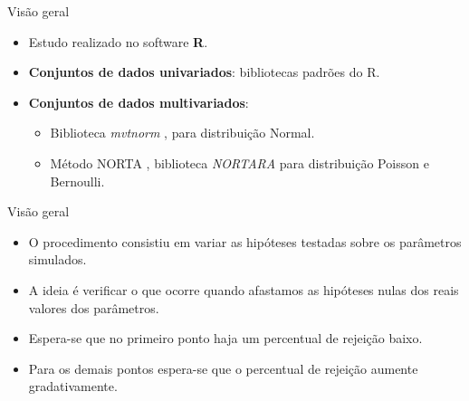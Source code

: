 \documentclass[
  ignorenonframetext,
  serif,
  professionalfont,
  usenames,
  dvipsnames,
  aspectratio = 169]{beamer}
\begin{document}
\begin{frame}{Visão geral}
\protect\hypertarget{visuxe3o-geral-2}{}
\begin{itemize}
    \itemsep 2ex
    
  \item Estudo realizado no software \textbf{R}.

  \item \textbf{Conjuntos de dados univariados}: bibliotecas padrões do R. 

  \item \textbf{Conjuntos de dados multivariados}:
    \begin{itemize}
      \item Biblioteca \emph{mvtnorm} \citep{mvtnorm1}, \citep{mvtnorm2} para distribuição Normal.

        \item Método NORTA \citep{cario1997modeling}, biblioteca \emph{NORTARA} \citep{nortara} para distribuição Poisson e Bernoulli.
    \end{itemize}
\end{itemize}
\end{frame}

\begin{frame}{Visão geral}
\protect\hypertarget{visuxe3o-geral-3}{}
\begin{itemize}
  \itemsep 2ex
    
  \item O procedimento consistiu em variar as hipóteses testadas sobre os parâmetros simulados. 

  \item A ideia é verificar o que ocorre quando afastamos as hipóteses nulas dos reais valores dos parâmetros. 

  \item Espera-se que no primeiro ponto haja um percentual de rejeição baixo. 

  \item Para os demais pontos espera-se que o percentual de rejeição aumente gradativamente.
  
\end{itemize}
\end{frame}
\end{document}
